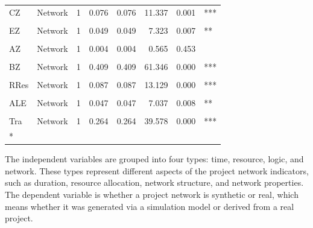 \documentclass[preprint,
3p]{elsarticle} %
\begin{document}
\begin{longtable}[t]{llrrrrrl}
CZ & Network & 1 & 0.076 & 0.076 & 11.337 & 0.001 & ***\\
\cellcolor{gray!10}{HZ} & \cellcolor{gray!10}{Network} & \cellcolor{gray!10}{1} & \cellcolor{gray!10}{0.133} & \cellcolor{gray!10}{0.133} & \cellcolor{gray!10}{19.942} & \cellcolor{gray!10}{0.000} & \cellcolor{gray!10}{***}\\
EZ & Network & 1 & 0.049 & 0.049 & 7.323 & 0.007 & **\\
\cellcolor{gray!10}{PRZ} & \cellcolor{gray!10}{Network} & \cellcolor{gray!10}{1} & \cellcolor{gray!10}{0.003} & \cellcolor{gray!10}{0.003} & \cellcolor{gray!10}{0.385} & \cellcolor{gray!10}{0.536} & \cellcolor{gray!10}{}\\
\addlinespace
AZ & Network & 1 & 0.004 & 0.004 & 0.565 & 0.453 & \\
\cellcolor{gray!10}{PZ} & \cellcolor{gray!10}{Network} & \cellcolor{gray!10}{1} & \cellcolor{gray!10}{0.005} & \cellcolor{gray!10}{0.005} & \cellcolor{gray!10}{0.737} & \cellcolor{gray!10}{0.391} & \cellcolor{gray!10}{}\\
BZ & Network & 1 & 0.409 & 0.409 & 61.346 & 0.000 & ***\\
\cellcolor{gray!10}{BEZ} & \cellcolor{gray!10}{Network} & \cellcolor{gray!10}{1} & \cellcolor{gray!10}{0.092} & \cellcolor{gray!10}{0.092} & \cellcolor{gray!10}{13.754} & \cellcolor{gray!10}{0.000} & \cellcolor{gray!10}{***}\\
RRes & Network & 1 & 0.087 & 0.087 & 13.129 & 0.000 & ***\\
\addlinespace
\cellcolor{gray!10}{SRes} & \cellcolor{gray!10}{Network} & \cellcolor{gray!10}{1} & \cellcolor{gray!10}{0.013} & \cellcolor{gray!10}{0.013} & \cellcolor{gray!10}{2.016} & \cellcolor{gray!10}{0.157} & \cellcolor{gray!10}{}\\
ALE & Network & 1 & 0.047 & 0.047 & 7.037 & 0.008 & **\\
\cellcolor{gray!10}{GE} & \cellcolor{gray!10}{Network} & \cellcolor{gray!10}{1} & \cellcolor{gray!10}{0.004} & \cellcolor{gray!10}{0.004} & \cellcolor{gray!10}{0.553} & \cellcolor{gray!10}{0.458} & \cellcolor{gray!10}{}\\
Tra & Network & 1 & 0.264 & 0.264 & 39.578 & 0.000 & ***\\
\midrule*
\end{longtable}
\endgroup{}

The independent variables are grouped into four types: time, resource,
logic, and network. These types represent different aspects of the
project network indicators, such as duration, resource allocation,
network structure, and network properties. The dependent variable is
whether a project network is synthetic or real, which means whether it
was generated via a simulation model or derived from a real project.
\end{document}

